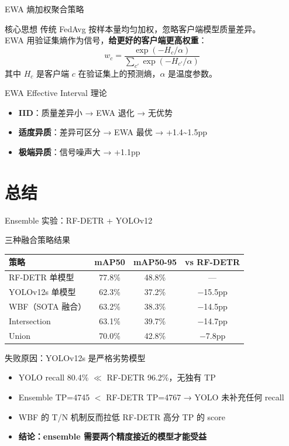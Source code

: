 \documentclass[aspectratio=169, 10pt]{beamer}
\begin{document}
\begin{frame}{EWA 熵加权聚合策略}
  \begin{block}{核心思想}
    传统 FedAvg 按样本量均匀加权，忽略客户端模型质量差异。\\
    EWA 用验证集熵作为信号，\textbf{给更好的客户端更高权重}：
    \[
      w_c = \frac{\exp(-H_c / \alpha)}{\sum_{c'} \exp(-H_{c'} / \alpha)}
    \]
    其中 $H_c$ 是客户端 $c$ 在验证集上的预测熵，$\alpha$ 是温度参数。
  \end{block}
  \vspace{0em}
  \begin{block}{EWA Effective Interval 理论}
    \begin{itemize}
      \item \textbf{IID}：质量差异小 → EWA 退化 → \alert{无优势}
      \item \textbf{适度异质}：差异可区分 → EWA 最优 → \alert{+1.4\textasciitilde 1.5pp}
      \item \textbf{极端异质}：信号噪声大 → \alert{+1.1pp}
    \end{itemize}
  \end{block}
\end{frame}

\section{总结}

\begin{frame}{Ensemble 实验：RF-DETR + YOLOv12}
  \begin{block}{三种融合策略结果}
    \begin{tabular}{lccc}
      \toprule
      策略 & mAP50 & mAP50-95 & vs RF-DETR \\
      \midrule
      RF-DETR 单模型 & 77.8\% & 48.8\% & — \\
      YOLOv12s 单模型 & 62.3\% & 37.2\% & $-$15.5pp \\
      \midrule
      WBF（SOTA 融合） & 63.2\% & 38.3\% & $-$14.5pp \\
      Intersection & 63.1\% & 39.7\% & $-$14.7pp \\
      Union & 70.0\% & 42.8\% & $-$7.8pp \\
      \bottomrule
    \end{tabular}
  \end{block}
  \begin{alertblock}{失败原因：YOLOv12s 是严格劣势模型}
    \begin{itemize}
      \item YOLO recall 80.4\% $\ll$ RF-DETR 96.2\%，无独有 TP
      \item Ensemble TP=4745 $<$ RF-DETR TP=4767 → YOLO 未补充任何 recall
      \item WBF 的 T/N 机制反而拉低 RF-DETR 高分 TP 的 score
      \item \textbf{结论：ensemble 需要两个精度接近的模型才能受益}
    \end{itemize}
  \end{alertblock}
\end{frame}
\end{document}
